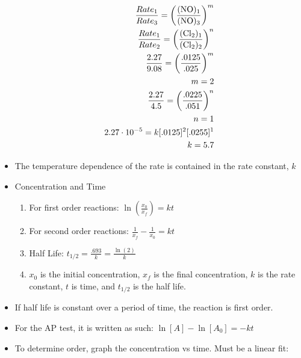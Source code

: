 \documentclass[12pt]{article}
\begin{document}
\begin{itemize}
    \begin{equation}
      \begin{split}
        \frac{Rate_1}{Rate_3}=\left( \frac{(\ce{NO})_1}{(\ce{NO})_3} \right)^m\\
        \frac{Rate_1}{Rate_2}=\left( \frac{(\ce{Cl2})_1}{(\ce{Cl2})_2} \right)^n\\
        \frac{2.27}{9.08}=\left( \frac{.0125}{.025} \right)^m\\
        m=2\\
        \frac{2.27}{4.5}=\left( \frac{.0225}{.051} \right)^n\\
        n=1\\
        2.27\cdot10^{-5}=k[.0125]^2[.0255]^1\\
        k=5.7
      \end{split}
      \label{2}
    \end{equation}

  \item The temperature dependence of the rate is contained in the rate constant, $k$

  \item Concentration and Time

    \begin{enumerate}

      \item For first order reactions: $\ln\left(\frac{x_0}{x_f}\right)=kt$

      \item For second order reactions: $\frac{1}{x_f}-\frac{1}{x_0}=kt$

      \item Half Life: $t_{1/2}=\frac{.693}{k}=\frac{\ln(2)}{k}$

      \item $x_0$ is the initial concentration, $x_f$ is the final concentration, $k$ is the rate constant, $t$ is time, and $t_{1/2}$ is the half life.

    \end{enumerate}

  \item If half life is constant over a period of time, the reaction is first order.

  \item For the AP test, it is written as such: $\ln[A]-\ln[A_0]=-kt$

  \item To determine order, graph the concentration vs time. Must be a linear fit:


\end{itemize}
\end{document}
